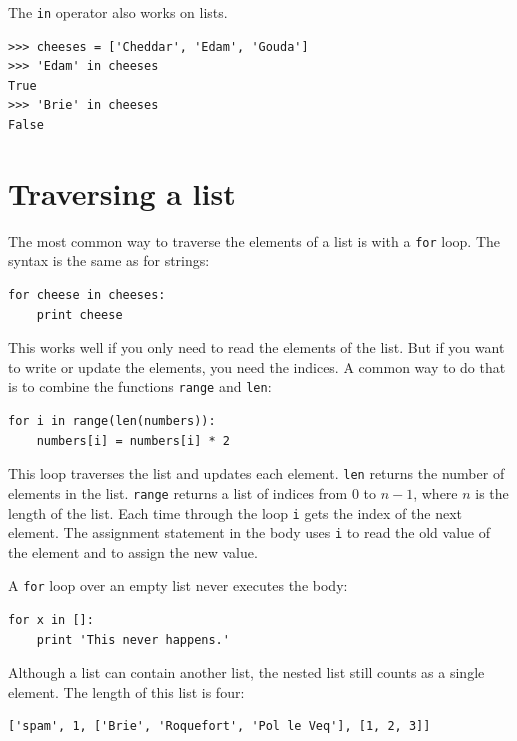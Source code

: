 \documentclass[10pt]{book}
\begin{document}

The {\tt in} operator also works on lists.

\begin{verbatim}
>>> cheeses = ['Cheddar', 'Edam', 'Gouda']
>>> 'Edam' in cheeses
True
>>> 'Brie' in cheeses
False
\end{verbatim}


\section{Traversing a list}

The most common way to traverse the elements of a list is
with a {\tt for} loop.  The syntax is the same as for strings:

\begin{verbatim}
for cheese in cheeses:
    print cheese
\end{verbatim}
%
This works well if you only need to read the elements of the
list.  But if you want to write or update the elements, you
need the indices.  A common way to do that is to combine
the functions {\tt range} and {\tt len}:

\begin{verbatim}
for i in range(len(numbers)):
    numbers[i] = numbers[i] * 2
\end{verbatim}
%
This loop traverses the list and updates each element.  {\tt len}
returns the number of elements in the list.  {\tt range} returns
a list of indices from 0 to $n-1$, where $n$ is the length of
the list.  Each time through the loop {\tt i} gets the index
of the next element.  The assignment statement in the body uses
{\tt i} to read the old value of the element and to assign the
new value.

A {\tt for} loop over an empty list never executes the body:

\begin{verbatim}
for x in []:
    print 'This never happens.'
\end{verbatim}
%
Although a list can contain another list, the nested
list still counts as a single element.  The length of this list is
four:

\begin{verbatim}
['spam', 1, ['Brie', 'Roquefort', 'Pol le Veq'], [1, 2, 3]]
\end{verbatim}
\end{document}
